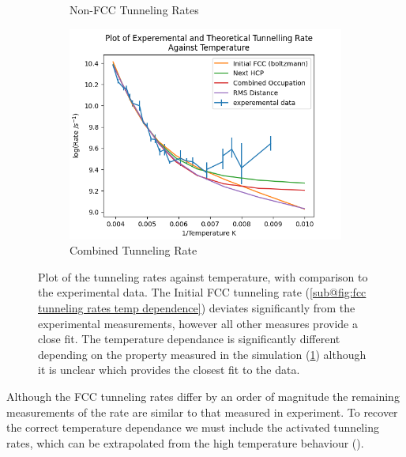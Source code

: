 \begin{figure}[htbp]
\begin{subfigure}{0.3\linewidth}
        \caption{Non-FCC Tunneling Rates
        }\label{sub@fig:other tunneling rates temp dependence}
    \end{subfigure}
    \hfill
    \begin{subfigure}{0.3\linewidth}
        \centering
        \includegraphics[width = 0.9\linewidth]{Figures/Redfield/Plot of redfield temperature dependance close points corrected.png}
        \caption{Combined Tunneling Rate
        }\label{sub@fig:rates with activated tunneling}
    \end{subfigure}
    \caption{Plot of the tunneling
        rates against temperature, with comparison
        to the experimental data.
        The Initial FCC tunneling rate
        (\cref{sub@fig:fcc tunneling rates temp dependence})
        deviates significantly from the experimental
        measurements, however all other measures
        provide a close fit.
        The temperature dependance
        is significantly different
        depending on the
        property measured
        in the simulation
        (\cref{sub@fig:other tunneling rates temp dependence})
        although it is unclear
        which provides the
        closest fit to the data.
    }\label{fig:tunneling rate against temperature}
\end{figure}
Although the FCC tunneling
rates differ by an order of
magnitude the remaining
measurements of the rate
are similar to that measured
in experiment. To recover the
correct temperature dependance
we must include
the activated tunneling rates, which
can be extrapolated from the
high temperature behaviour ().
